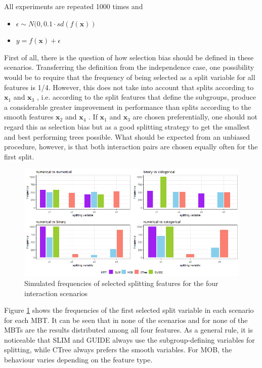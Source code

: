 All experiments are repeated 1000 times and 
\begin{itemize}
     \item $\epsilon \sim N(0, 0.1 \cdot sd(f(\textbf{x}))$
    \item $y = f(\textbf{x}) + \epsilon$   
\end{itemize}


First of all, there is the question of how selection bias should be defined in these scenarios. Transferring the definition from the independence case, one possibility would be to require that the frequency of being selected as a split variable for all features is 1/4.  However, this does not take into account that splits according to $\textbf{x}_1$  and $\textbf{x}_3$ , i.e. according to the split features that define the subgroups, produce a considerable greater improvement in performance than splits according to the smooth features $\textbf{x}_2$  and $\textbf{x}_4$ . If $\textbf{x}_1$  and $\textbf{x}_3$  are chosen preferentially, one should not regard this as selection bias but as a good splitting strategy to get the smallest and best performing trees possible. What should be expected from an unbiased procedure, however, is that both interaction pairs are chosen equally often for the first split.



\begin{figure}[!htb]
    \centering   
    \includegraphics[width = 16cm]{Figures/simulations/batchtools/selection_bias_general/interactions.png}
    \caption{Simulated frequencies of selected splitting features for the four interaction scenarios}
    \label{fig:selection_bias_interactions}
\end{figure}

Figure \ref{fig:selection_bias_interactions} shows the frequencies of the first selected split variable in each scenario for each MBT. It can be seen that in none of the scenarios and for none of the MBTs are the results distributed among all four features. 
As a general rule, it is noticeable that SLIM and GUIDE always use the subgroup-defining variables for splitting, while CTree always prefers the smooth variables. For MOB, the behaviour varies depending on the feature type.

